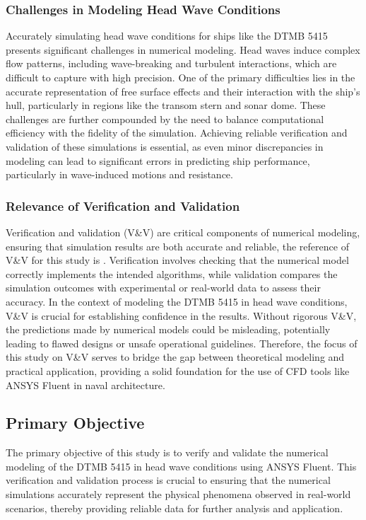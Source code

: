 \documentclass[12pt]{article} %
\begin{document}
\subsubsection{Challenges in Modeling Head Wave Conditions}
Accurately simulating head wave conditions for ships like the DTMB 5415 presents significant 
challenges in numerical modeling. Head waves induce complex flow patterns, including wave-breaking 
and turbulent interactions, which are difficult to capture with high precision. One of the primary 
difficulties lies in the accurate representation of free surface effects and their interaction with 
the ship's hull, particularly in regions like the transom stern and sonar dome. These challenges are 
further compounded by the need to balance computational efficiency with the fidelity of the simulation. 
Achieving reliable verification and validation of these simulations is essential, as even minor 
discrepancies in modeling can lead to significant errors in predicting ship performance, particularly 
in wave-induced motions and resistance.

\subsubsection{Relevance of Verification and Validation}
Verification and validation (V\&V) are critical components of numerical modeling, ensuring that 
simulation results are both accurate and reliable, the reference of V\&V for this study is \cite{Begovic2017}. 
Verification involves checking that the 
numerical model correctly implements the intended algorithms, while validation compares the 
simulation outcomes with experimental or real-world data to assess their accuracy. In the 
context of modeling the DTMB 5415 in head wave conditions, V\&V is crucial for establishing 
confidence in the results. Without rigorous V\&V, the predictions made by numerical models 
could be misleading, potentially leading to flawed designs or unsafe operational guidelines. 
Therefore, the focus of this study on V\&V serves to bridge the gap between theoretical modeling 
and practical application, providing a solid foundation for the use of CFD tools like ANSYS 
Fluent in naval architecture.

\subsection{Primary Objective}
The primary objective of this study is to verify and validate the numerical modeling of the DTMB 5415 
in head wave conditions using ANSYS Fluent. This verification and validation process is crucial to 
ensuring that the numerical simulations accurately represent the physical phenomena observed in 
real-world scenarios, thereby providing reliable data for further analysis and application.
\end{document}
